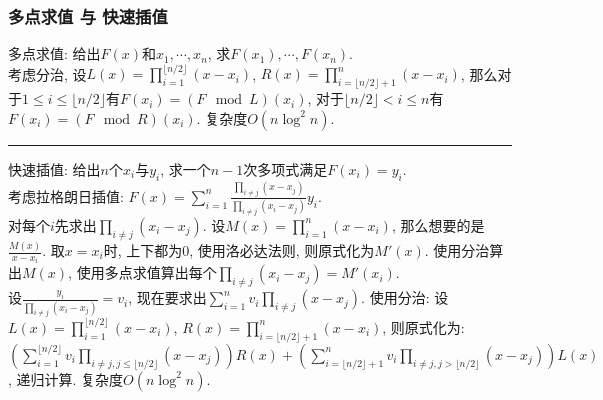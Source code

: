 \subsubsection{多点求值 与 快速插值}

多点求值: 给出$F(x)$和$x_1,\cdots,x_n$, 求$F(x_1),\cdots,F(x_n)$. \\
\noindent
考虑分治, 设$L(x)=\prod_{i=1}^{\lfloor n/2\rfloor}(x-x_i)$, $R(x)=\prod_{i=\lfloor n/2\rfloor+1}^{n}(x-x_i)$, 那么对于$1\leq i\leq\lfloor n/2\rfloor$有$F(x_i)=(F\mod L)(x_i)$, 对于$\lfloor n/2\rfloor<i\leq n$有$F(x_i)=(F\mod R)(x_i)$. 复杂度$O(n\log^2n)$. \par
\hrule
快速插值: 给出$n$个$x_i$与$y_i$, 求一个$n-1$次多项式满足$F(x_i)=y_i$. \\
\noindent
考虑拉格朗日插值: $F(x)=\sum_{i=1}^n\frac{\prod_{i\neq j}(x-x_j)}{\prod_{i\neq j}(x_i-x_j)}y_i$. \\
\noindent
对每个$i$先求出$\prod_{i\neq j}(x_i-x_j)$. 设$M(x)=\prod_{i=1}^{n}(x-x_i)$, 那么想要的是$\frac{M(x)}{x-x_i}$. 取$x=x_i$时, 上下都为0, 使用洛必达法则, 则原式化为$M'(x)$. 使用分治算出$M(x)$, 使用多点求值算出每个$\prod_{i\neq j}(x_i-x_j)=M'(x_i)$. \\
\noindent
设$\frac{y_i}{\prod_{i\neq j}(x_i-x_j)}=v_i$, 现在要求出$\sum_{i=1}^{n}v_i\prod_{i\neq j}(x-x_j)$. 使用分治: 设$L(x)=\prod_{i=1}^{\lfloor n/2\rfloor}(x-x_i)$, $R(x)=\prod_{i=\lfloor n/2\rfloor+1}^n(x-x_i)$, 则原式化为: $\left( \sum_{i=1}^{\lfloor n/2\rfloor}v_i\prod_{i\neq j,j\leq\lfloor n/2\rfloor}(x-x_j)\right)R(x)+\left( \sum_{i=\lfloor n/2\rfloor+1}^{n}v_i\prod_{i\neq j,j>\lfloor n/2\rfloor}(x-x_j)\right)L(x)$, 递归计算. 复杂度$O(n\log^2n)$. \par